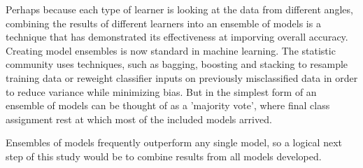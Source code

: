 Perhaps because each type of learner is looking at the data from different angles, combining the results of different learners into an ensemble of models is a technique that has demonstrated its effectiveness at imporving overall accuracy. Creating model ensembles is now standard in machine learning. The statistic community uses techniques, such as bagging, boosting and stacking to resample training data or reweight classifier inputs on previously misclassified data in order to reduce variance while minimizing bias. But in the simplest form of an ensemble of models can be thought of as a 'majority vote', where final class assignment rest at which most of the included models arrived.


Ensembles of models frequently outperform any single model, so a logical next step of this study would be to combine results from all models developed.

